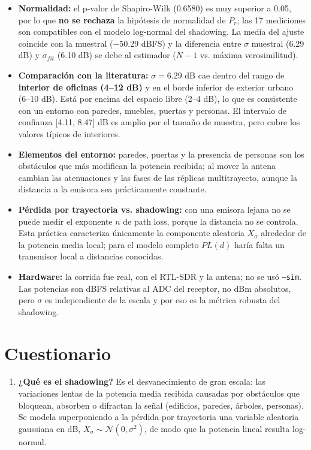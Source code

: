 \documentclass[11pt,a4paper]{article}
\begin{document}
\begin{itemize}
  \item \textbf{Normalidad:} el p-valor de Shapiro-Wilk (0.6580) es muy superior a 0.05, por lo que \textbf{no se rechaza} la hipótesis de normalidad de $P_r$; las 17 mediciones son compatibles con el modelo log-normal del shadowing. La media del ajuste coincide con la muestral ($-$50.29 dBFS) y la diferencia entre $\sigma$ muestral (6.29 dB) y $\sigma_{fit}$ (6.10 dB) se debe al estimador ($N-1$ vs. máxima verosimilitud).
  \item \textbf{Comparación con la literatura:} $\sigma = 6.29$ dB cae dentro del rango de \textbf{interior de oficinas (4--12 dB)} y en el borde inferior de exterior urbano (6--10 dB). Está por encima del espacio libre (2--4 dB), lo que es consistente con un entorno con paredes, muebles, puertas y personas. El intervalo de confianza [4.11, 8.47] dB es amplio por el tamaño de muestra, pero cubre los valores típicos de interiores.
  \item \textbf{Elementos del entorno:} paredes, puertas y la presencia de personas son los obstáculos que más modifican la potencia recibida; al mover la antena cambian las atenuaciones y las fases de las réplicas multitrayecto, aunque la distancia a la emisora sea prácticamente constante.
  \item \textbf{Pérdida por trayectoria vs. shadowing:} con una emisora lejana no se puede medir el exponente $n$ de path loss, porque la distancia no se controla. Esta práctica caracteriza únicamente la componente aleatoria $X_\sigma$ alrededor de la potencia media local; para el modelo completo $PL(d)$ haría falta un transmisor local a distancias conocidas.
  \item \textbf{Hardware:} la corrida fue real, con el RTL-SDR y la antena; no se usó \texttt{--sim}. Las potencias son dBFS relativas al ADC del receptor, no dBm absolutos, pero $\sigma$ es independiente de la escala y por eso es la métrica robusta del shadowing.
\end{itemize}

\section{Cuestionario}

\begin{enumerate}
  \item \textbf{¿Qué es el shadowing?} Es el desvanecimiento de gran escala: las variaciones lentas de la potencia media recibida causadas por obstáculos que bloquean, absorben o difractan la señal (edificios, paredes, árboles, personas). Se modela superponiendo a la pérdida por trayectoria una variable aleatoria gaussiana en dB, $X_\sigma \sim \mathcal{N}(0,\sigma^2)$, de modo que la potencia lineal resulta log-normal.
\end{enumerate}
\end{document}
